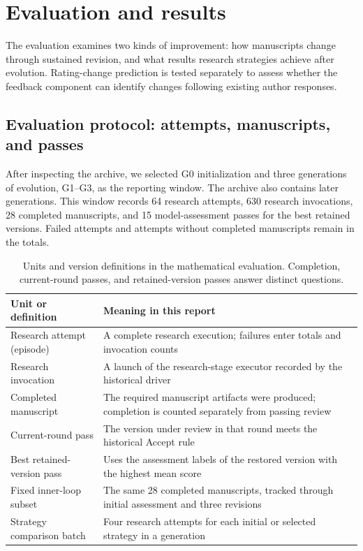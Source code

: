 \FloatBarrier
{}
\section{Evaluation and results}
\label{sec:evaluation}
The evaluation examines two kinds of improvement: how manuscripts change through sustained revision, and what results research strategies achieve after evolution. Rating-change prediction is tested separately to assess whether the feedback component can identify changes following existing author responses.

\FloatBarrier
\subsection{Evaluation protocol: attempts, manuscripts, and passes}
\label{sec:protocol}
After inspecting the archive, we selected G0 initialization and three generations of evolution, G1--G3, as the reporting window. The archive also contains later generations. This window records 64 research attempts, 630 research invocations, 28 completed manuscripts, and 15 model-assessment passes for the best retained versions. Failed attempts and attempts without completed manuscripts remain in the totals.

\begin{table}[H]
\centering\small
\begin{tabularx}{\textwidth}{P{43mm}Y}
\toprule
{}
\textbf{Unit or definition} & \textbf{Meaning in this report}\\
\midrule
Research attempt (episode) & A complete research execution; failures enter totals and invocation counts\\
Research invocation & A launch of the research-stage executor recorded by the historical driver\\
Completed manuscript & The required manuscript artifacts were produced; completion is counted separately from passing review\\
Current-round pass & The version under review in that round meets the historical Accept rule\\
Best retained-version pass & Uses the assessment labels of the restored version with the highest mean score\\
Fixed inner-loop subset & The same 28 completed manuscripts, tracked through initial assessment and three revisions\\
Strategy comparison batch & Four research attempts for each initial or selected strategy in a generation\\
\bottomrule
\end{tabularx}
\caption{Units and version definitions in the mathematical evaluation. Completion, current-round passes, and retained-version passes answer distinct questions.}
\label{tab:protocol}
\end{table}

